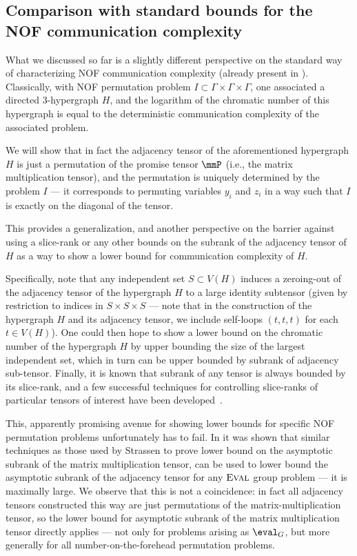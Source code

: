 \subsection{Comparison with standard bounds for the NOF communication complexity}
What we discussed so far is a slightly different perspective on the standard way of characterizing NOF communication complexity (already present in \cite{CFL83}). Classically, with  NOF permutation problem $I \subset \Gamma \times \Gamma \times \Gamma$, one associated a directed 3-hypergraph $H$, and the logarithm of the chromatic number of this hypergraph is equal to the deterministic communication complexity of the associated problem.

We will show that in fact the adjacency tensor of the aforementioned hypergraph $H$ is just a permutation of the promise tensor $\mmP$ (i.e., the matrix multiplication tensor), and the permutation is uniquely determined by the problem $I$ --- it corresponds to permuting variables $y_i$ and $z_i$ in a way such that $I$ is exactly on the diagonal of the tensor.

This provides a generalization, and another perspective on the barrier against using a slice-rank or any other bounds on the subrank of the adjacency tensor of $H$ as a way to show a lower bound for communication complexity of $H$. 

Specifically, note that any independent set $S \subset V(H)$ induces a zeroing-out of the adjacency tensor of the hypergraph $H$ to a large identity subtensor (given by restriction to indices in $S \times S \times S$ --- note that in the construction of the hypergraph $H$ and its adjacency tensor, we include self-loops $(t,t,t)$ for each $t \in V(H)$). One could then hope to show a lower bound on the chromatic number of the hypergraph $H$ by upper bounding the size of the largest independent set, which in turn can be upper bounded by subrank of adjacency sub-tensor. Finally, it is known that subrank of any tensor is always bounded by its slice-rank, and a few successful techniques for controlling slice-ranks of particular tensors of interest have been developed~\cite{T16,BCHGNSU17}.

This, apparently promising avenue for showing lower bounds for specific NOF permutation problems unfortunately has to fail. In \cite{CFTZ21} it was shown that similar techniques as those used by Strassen to prove lower bound on the asymptotic subrank of the matrix multiplication tensor, can be used to lower bound the asymptotic subrank of the adjacency tensor for any $\textsc{Eval}$ group problem --- it is maximally large. We observe that this is not a coincidence: in fact all adjacency tensors constructed this way are just permutations of the matrix-multiplication tensor, so the lower bound for asymptotic subrank of the matrix multiplication tensor directly applies --- not only for problems arising as $\eval_G$, but more generally for all number-on-the-forehead permutation problems.


